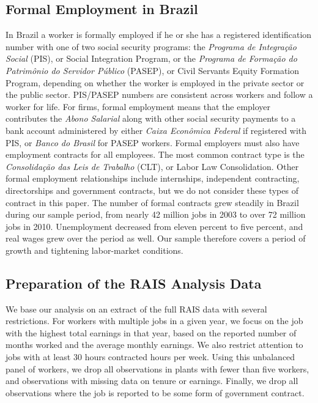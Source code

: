 \subsection{Formal Employment in Brazil}
In Brazil a worker is formally employed if he or she has a registered identification number with one of two social security programs: the \emph{Programa de Integra\c{c}\~{a}o Social} (PIS), or Social Integration Program, or the \emph{Programa de Forma\c{c}\~{a}o do Patrim\^{o}nio do Servidor P\'{u}blico} (PASEP), or Civil Servants Equity Formation Program, depending on whether the worker is employed in the private sector or the public sector. PIS/PASEP numbers are consistent across workers and follow a worker for life. For firms, formal employment means that the employer contributes the \textit{Abono Salarial} along with other social security payments to a bank account administered by either \emph{Caixa Econ\^{o}mica Federal} if registered with PIS, or \emph{Banco do Brasil} for PASEP workers. Formal employers must also have employment contracts for all employees. The most common contract type is the \emph{Consolida\c{c}\~{a}o das Leis de Trabalho} (CLT), or Labor Law Consolidation. Other formal employment relationships include internships, independent contracting, directorships and government contracts, but we do not consider these types of contract in this paper.
The number of formal contracts grew steadily in Brazil during our sample period, from nearly 42 million jobs in 2003 to over 72 million jobs in 2010. Unemployment decreased from eleven percent to five percent, and real wages grew over the period as well. Our sample therefore covers a period of growth and tightening labor-market conditions.

\subsection{Preparation of the RAIS Analysis Data}
\label{sec:RAIS_analysis_description}
We base our analysis on an extract of the full RAIS data with several restrictions.
For workers with multiple jobs in a given year, we focus on the job with the highest total earnings in that year, based on the reported number of months worked and the average monthly earnings.
We also restrict attention to jobs with at least 30 hours contracted hours per week.
Using this unbalanced panel of workers, we drop all observations in plants with fewer than five workers, and observations with missing data on tenure or earnings. 
Finally, we drop all observations where the job is reported to be some form of government contract.

